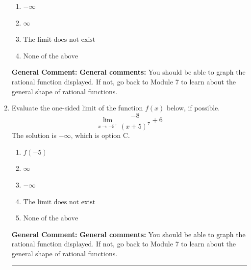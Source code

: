 \documentclass{extbook}[14pt]
\newcommand{\litem}[1]{\item #1

\rule{\textwidth}{0.4pt}}
\begin{document}
\begin{enumerate}
{\begin{enumerate}[label=\Alph*.]
\item \( -\infty \)


\item \( \infty \)


\item \( \text{The limit does not exist} \)


\item \( \text{None of the above} \)


\end{enumerate}

\textbf{General Comment:} \textbf{General comments:} You should be able to graph the rational function displayed. If not, go back to Module 7 to learn about the general shape of rational functions.
}
\litem{
Evaluate the one-sided limit of the function $f(x)$ below, if possible.
\[ \lim_{x \rightarrow -5^+} \frac{-8}{(x+5)^7}+6 \]The solution is \( -\infty \), which is option C.\begin{enumerate}[label=\Alph*.]
\item \( f(-5) \)


\item \( \infty \)


\item \( -\infty \)


\item \( \text{The limit does not exist} \)


\item \( \text{None of the above} \)


\end{enumerate}

\textbf{General Comment:} \textbf{General comments:} You should be able to graph the rational function displayed. If not, go back to Module 7 to learn about the general shape of rational functions.
}
\end{enumerate}
\end{document}
